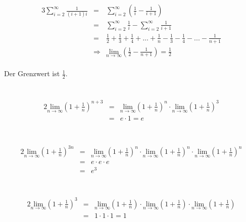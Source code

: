 \documentclass[10pt,a4paper,oneside,ngerman,numbers=noenddot]{scrartcl}
\begin{document}
\begin{alignat*}{3}
\sum\limits_{i=2}^{\infty} \frac{1}{(i+1)i} &=& \sum\limits_{i=2}^{\infty} \left( \frac{1}{i} - \frac{1}{i+1} \right) \\
&=& \sum\limits_{i=2}^{\infty} \frac{1}{i} - \sum\limits_{i=2}^{\infty} \frac{1}{i+1} \\
&=& \frac{1}{2} + \frac{1}{3} + \frac{1}{4} + ... + \frac{1}{n} - \frac{1}{3} - \frac{1}{4} - ... - \frac{1}{n+1} \\
&\Rightarrow & \underset{n \rightarrow \infty}{\text{lim}} \left(\frac{1}{2} - \frac{1}{n+1} \right) = \frac{1}{2}
\end{alignat*}\\
Der Grenzwert ist $\frac{1}{2}$.
\section{} %
\subsection{}
\subsubsection{} %
\begin{alignat*}{2}
\underset{n \rightarrow \infty}{\text{lim}} \left(1 + \frac{1}{n} \right)^{n+3} &=& \underset{n \rightarrow \infty}{\text{lim}} \left(1 + \frac{1}{n} \right)^{n} \cdot \underset{n \rightarrow \infty}{\text{lim}} \left(1 + \frac{1}{n} \right)^{3} \\
&=& e \cdot 1 = e
\end{alignat*}\\
\subsubsection{} %
\begin{alignat*}{2}
\underset{n \rightarrow \infty}{\text{lim}} \left(1 + \frac{1}{n} \right)^{3n} &=& \underset{n \rightarrow \infty}{\text{lim}} \left(1 + \frac{1}{n} \right)^{n} \cdot \underset{n \rightarrow \infty}{\text{lim}} \left(1 + \frac{1}{n} \right)^{n} \cdot \underset{n \rightarrow \infty}{\text{lim}} \left(1 + \frac{1}{n} \right)^{n} \\
&=& e \cdot e \cdot e \\
&=& e^{3}
\end{alignat*}\\
\subsubsection{} %
\begin{alignat*}{2}
\underset{n \rightarrow \infty}{\text{lim}} \left(1 + \frac{1}{n} \right)^{3} &=& \underset{n \rightarrow \infty}{\text{lim}} \left(1 + \frac{1}{n} \right) \cdot \underset{n \rightarrow \infty}{\text{lim}} \left(1 + \frac{1}{n} \right) \cdot \underset{n \rightarrow \infty}{\text{lim}} \left(1 + \frac{1}{n} \right) \\
&=& 1 \cdot 1 \cdot 1 = 1
\end{alignat*}
\end{document}
